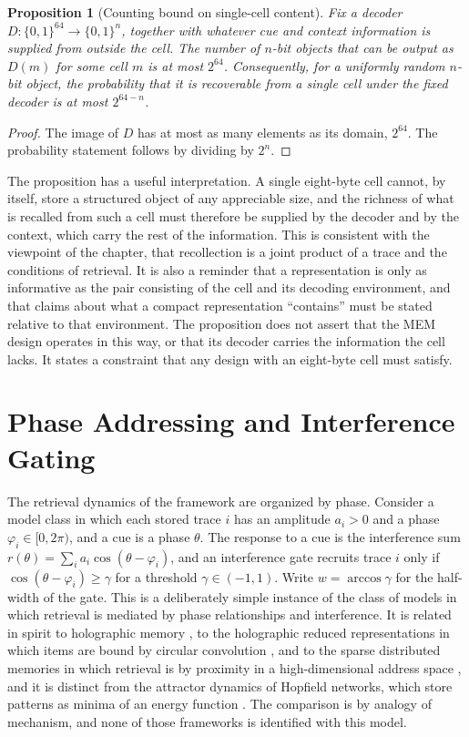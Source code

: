 \documentclass[11pt,twoside,openright]{book}
\theoremstyle{plain}
\newtheorem{proposition}[theorem]{Proposition}
\theoremstyle{definition}
\theoremstyle{remark}
\newcommand{\memeight}{\mbox{MEM\textbar 8}}
\begin{document}
\begin{proposition}[Counting bound on single-cell content]\label{prop:count}
Fix a decoder $D:\{0,1\}^{64}\to\{0,1\}^n$, together with whatever cue and context information is supplied from outside the cell. The number of $n$-bit objects that can be output as $D(m)$ for some cell $m$ is at most $2^{64}$. Consequently, for a uniformly random $n$-bit object, the probability that it is recoverable from a single cell under the fixed decoder is at most $2^{64-n}$.
\end{proposition}

\begin{proof}
The image of $D$ has at most as many elements as its domain, $2^{64}$. The probability statement follows by dividing by $2^n$.
\end{proof}

The proposition has a useful interpretation. A single eight-byte cell cannot, by itself, store a structured object of any appreciable size, and the richness of what is recalled from such a cell must therefore be supplied by the decoder and by the context, which carry the rest of the information. This is consistent with the viewpoint of the chapter, that recollection is a joint product of a trace and the conditions of retrieval. It is also a reminder that a representation is only as informative as the pair consisting of the cell and its decoding environment, and that claims about what a compact representation ``contains'' must be stated relative to that environment. The proposition does not assert that the \memeight{} design operates in this way, or that its decoder carries the information the cell lacks. It states a constraint that any design with an eight-byte cell must satisfy.

\section{Phase Addressing and Interference Gating}

The retrieval dynamics of the framework are organized by phase. Consider a model class in which each stored trace $i$ has an amplitude $a_i>0$ and a phase $\varphi_i\in[0,2\pi)$, and a cue is a phase $\theta$. The response to a cue is the interference sum $r(\theta)=\sum_i a_i\cos(\theta-\varphi_i)$, and an interference gate recruits trace $i$ only if $\cos(\theta-\varphi_i)\ge\gamma$ for a threshold $\gamma\in(-1,1)$. Write $w=\arccos\gamma$ for the half-width of the gate. This is a deliberately simple instance of the class of models in which retrieval is mediated by phase relationships and interference. It is related in spirit to holographic memory \cite{gabor1969}, to the holographic reduced representations in which items are bound by circular convolution \cite{plate1995}, and to the sparse distributed memories in which retrieval is by proximity in a high-dimensional address space \cite{kanerva1988,kanerva2009}, and it is distinct from the attractor dynamics of Hopfield networks, which store patterns as minima of an energy function \cite{hopfield1982}. The comparison is by analogy of mechanism, and none of those frameworks is identified with this model.
\end{document}
